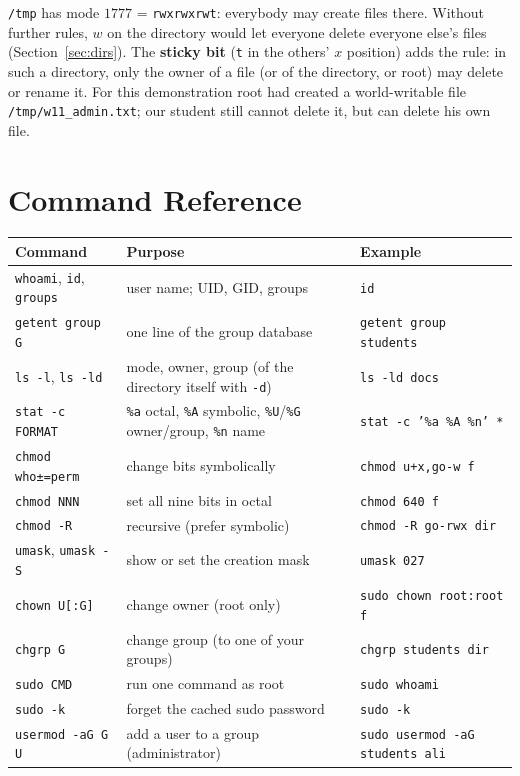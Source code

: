 \documentclass[11pt,a4paper]{article}
\newcommand{\term}[1]{\textbf{\color{mintdeep}#1}}
\newcommand{\cmd}[1]{\texttt{#1}}
\begin{document}


\texttt{/tmp} has mode $1777$ = \texttt{rwxrwxrwt}: everybody may create files there. Without further rules, $w$ on the directory would let everyone delete everyone else's files (Section~\ref{sec:dirs}). The \term{sticky bit} (\texttt{t} in the others' $x$ position) adds the rule: in such a directory, only the owner of a file (or of the directory, or root) may delete or rename it. For this demonstration root had created a world-writable file \texttt{/tmp/w11\_admin.txt}; our student still cannot delete it, but can delete his own file.

\section{Command Reference}

\begin{center}
\small
\begin{tabularx}{\linewidth}{@{}l X l@{}}
\toprule
\textbf{Command} & \textbf{Purpose} & \textbf{Example} \\
\midrule
\cmd{whoami}, \cmd{id}, \cmd{groups} & user name; UID, GID, groups & \cmd{id} \\
\cmd{getent group G} & one line of the group database & \cmd{getent group students} \\
\cmd{ls -l}, \cmd{ls -ld} & mode, owner, group (of the directory itself with \texttt{-d}) & \cmd{ls -ld docs} \\
\cmd{stat -c FORMAT} & \texttt{\%a} octal, \texttt{\%A} symbolic, \texttt{\%U}/\texttt{\%G} owner/group, \texttt{\%n} name & \cmd{stat -c '\%a \%A \%n' *} \\
\cmd{chmod who±=perm} & change bits symbolically & \cmd{chmod u+x,go-w f} \\
\cmd{chmod NNN} & set all nine bits in octal & \cmd{chmod 640 f} \\
\cmd{chmod -R} & recursive (prefer symbolic) & \cmd{chmod -R go-rwx dir} \\
\cmd{umask}, \cmd{umask -S} & show or set the creation mask & \cmd{umask 027} \\
\cmd{chown U[:G]} & change owner (root only) & \cmd{sudo chown root:root f} \\
\cmd{chgrp G} & change group (to one of your groups) & \cmd{chgrp students dir} \\
\cmd{sudo CMD} & run one command as root & \cmd{sudo whoami} \\
\cmd{sudo -k} & forget the cached sudo password & \cmd{sudo -k} \\
\cmd{usermod -aG G U} & add a user to a group (administrator) & \cmd{sudo usermod -aG students ali} \\
\bottomrule
\end{tabularx}
\end{center}
\end{document}
